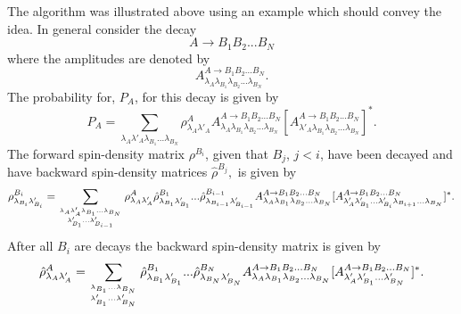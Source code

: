 The algorithm was illustrated above using an example which should 
convey the idea. In general consider the decay
\begin{equation}
A\rightarrow B_1B_2...B_N
\end{equation}
where the amplitudes are denoted by
\begin{equation}
A^{A\rightarrow B_1B_2...B_N}_{\lambda_A\lambda_{B_1}\lambda_{B_2}...\lambda_{B_N}}.
\end{equation}
The probability for, $P_A$, for this decay is given by
\begin{equation}
P_A=\sum_{\lambda_A\lambda'_{A}\lambda_{B_1}...\lambda_{B_N}}
	\rho^{A}_{\lambda_A\lambda'_{A}}
	A^{A\rightarrow B_1B_2...B_N}_{\lambda_A\lambda_{B_1}\lambda_{B_2}...\lambda_{B_N}}
[A^{A\rightarrow B_1B_2...B_N}_{\lambda'_{A}\lambda_{B_1}\lambda_{B_2}...\lambda_{B_N}}]^*  .
\end{equation}
The forward spin-density matrix $\rho^{B_i}$, given that $B_j$, $j<i$,
have been decayed and have backward spin-density matrices $\hat\rho^{B_j},$
is given by
\begin{equation}
\rho^{B_i}_{\lambda_{B_i}\lambda'_{B_i}}=
	\sum_{\lambda_A\lambda'_{A}
	\lambda_{B_1}...\lambda_{B_N} \atop
	\lambda'_{B_1}...\lambda'_{B_{i-1}}}
	\rho^{A}_{\lambda_A\lambda'_{A}}
	\hat\rho^{B_1}_{\lambda_{B_1}\lambda'_{B_1}}...
	\hat\rho^{B_{i-1}}_{\lambda_{B_{i-1}}\lambda'_{B_{i-1}}}
	A^{A\rightarrow B_1B_2...B_N}_{\lambda_A\lambda_{B_1}\lambda_{B_2}...\lambda_{B_N}}
[A^{A\rightarrow B_1B_2...B_N}_{\lambda'_{A}\lambda'_{B_1}...\lambda'_{B_{i}}\lambda_{B_{i+1}}...\lambda_{B_N}}]^*.
\end{equation}
After all $B_i$ are decays the backward spin-density matrix is given by
\begin{equation}
\hat\rho^{A}_{\lambda_{A}\lambda'_{A}}=
	\sum_{\lambda_{B_1}...\lambda_{B_N} \atop
	\lambda'_{B_1}...\lambda'_{B_{N}}}
	\hat\rho^{B_1}_{\lambda_{B_1}\lambda'_{B_1}}...
	\hat\rho^{B_{N}}_{\lambda_{B_{N}}\lambda'_{B_N}}
	A^{A\rightarrow B_1B_2...B_N}_{\lambda_A\lambda_{B_1}\lambda_{B_2}...\lambda_{B_N}}
[A^{A\rightarrow B_1B_2...B_N}_{\lambda'_{A}\lambda'_{B_1}...\lambda'_{B_N}}]^*.
\end{equation}




